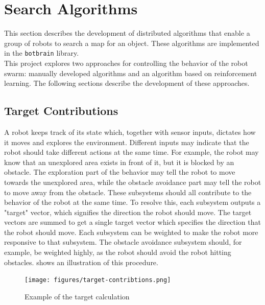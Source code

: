 
\section{Search Algorithms}
This section describes the development of distributed algorithms that enable a group of robots to search a map for an object. These algorithms are implemented in the \texttt{botbrain} library. \\

This project explores two approaches for controlling the behavior of the robot swarm: manually developed algorithms and an algorithm based on reinforcement learning. The following sections describe the development of these approaches.

\subsection{Target Contributions}
A robot keeps track of its state which, together with sensor inputs, dictates how it moves and explores the environment. Different inputs may indicate that the robot should take different actions at the same time. For example, the robot may {\color{red} know} that an unexplored area exists in front of it, but it is blocked by an obstacle. The exploration part of the behavior may tell the robot to move towards the unexplored area, while the obstacle avoidance part may {\color{red} tell} the robot to move away from the obstacle. These subsystems should all contribute to the behavior of the robot at the same time. To resolve this, each subsystem outputs a "target" vector, which signifies the direction the robot should move. The target vectors are summed to get a single target vector which specifies the direction that the robot should move. Each subsystem can be weighted to make the robot more responsive to that subsystem. The obstacle avoidance subsystem should, for example, be weighted highly, as the robot should avoid the robot hitting obstacles.  shows an illustration of this procedure.

\begin{figure}[H]
    \begin{center}
        \texttt{[image: figures/target-contribtions.png]}
    \end{center}
    \caption{Example of the target calculation}
    \label{fig:target-contributions}
\end{figure}


